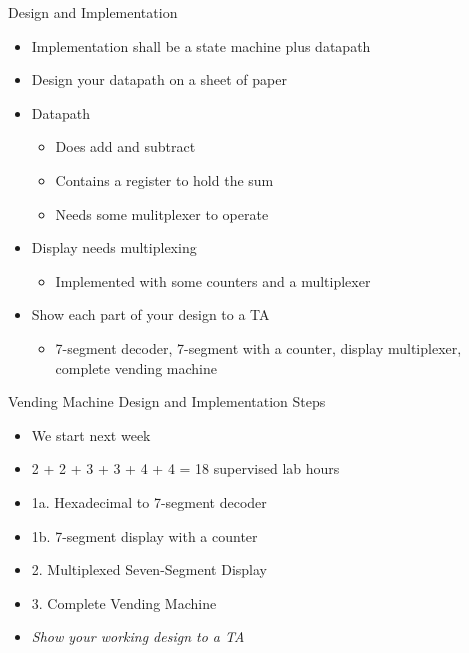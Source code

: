 \begin{frame}[fragile]{Design and Implementation}
\begin{itemize}
\item Implementation shall be a state machine plus datapath
\item Design your datapath on a sheet of paper
\item Datapath
\begin{itemize}
\item Does add and subtract
\item Contains a register to hold the sum
\item Needs some mulitplexer to operate
\end{itemize}
\item Display needs multiplexing
\begin{itemize}
\item Implemented with some counters and a multiplexer
\end{itemize}
\item Show each part of your design to a TA
\begin{itemize}
\item 7-segment decoder, 7-segment with a counter, display multiplexer, complete vending machine
\end{itemize}
\end{itemize}
\end{frame}

\begin{frame}[fragile]{Vending Machine Design and Implementation Steps}
\begin{itemize}
\item We start next week
\item 2 + 2 + 3 + 3 + 4 + 4 = 18 supervised lab hours
\item 1a. Hexadecimal to 7-segment decoder
\item 1b. 7-segment display with a counter
\item 2. Multiplexed Seven-Segment Display
\item 3. Complete Vending Machine
\item \emph{Show your working design to a TA}
\end{itemize}
\end{frame}

